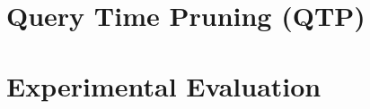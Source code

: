 \documentclass[abstracton,12pt]{scrartcl}
\theoremstyle{definition}
\begin{document}
\section{Query Time Pruning (QTP)}

\section{Experimental Evaluation}






\newpage



\end{document}
